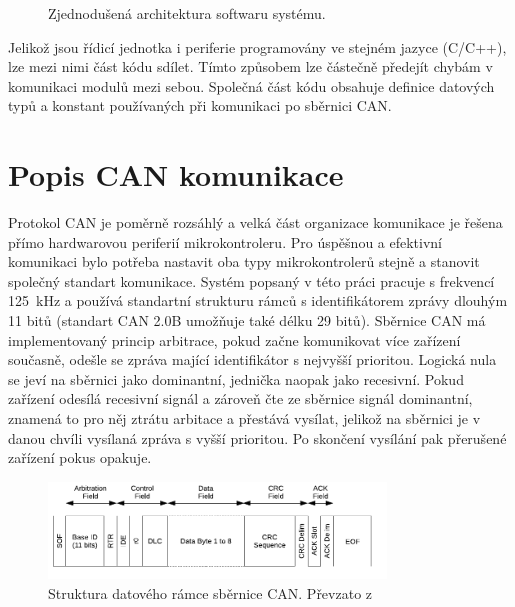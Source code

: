 \begin{figure}[h!]
        
        \caption{Zjednodušená architektura softwaru systému.}
        \label{fig:sw-blokove-schema}
    \end{figure}

    Jelikož jsou řídicí jednotka i periferie programovány ve stejném jazyce (C/C++), lze mezi nimi část kódu sdílet. Tímto způsobem lze částečně předejít chybám v komunikaci modulů mezi sebou. Společná část kódu obsahuje definice datových typů a konstant používaných při komunikaci po sběrnici CAN.  

\section{Popis CAN komunikace}
    Protokol CAN je poměrně rozsáhlý a velká část organizace komunikace je řešena přímo hardwarovou periferií mikrokontroleru. Pro úspěšnou a efektivní komunikaci bylo potřeba nastavit oba typy mikrokontrolerů stejně a stanovit společný standart komunikace. Systém popsaný v této práci pracuje s frekvencí \qty{125}{kHz} a používá standartní strukturu rámců s identifikátorem zprávy dlouhým 11 bitů (standart CAN 2.0B umožňuje také délku 29 bitů). Sběrnice CAN má implementovaný princip arbitrace, pokud začne komunikovat více zařízení současně, odešle se zpráva mající identifikátor s nejvyšší prioritou. Logická nula se jeví na sběrnici jako dominantní, jednička naopak jako recesivní. Pokud zařízení odesílá recesivní signál a zároveň čte ze sběrnice signál dominantní, znamená to pro něj ztrátu arbitace a přestává vysílat, jelikož na sběrnici je v danou chvíli vysílaná zpráva s vyšší prioritou. Po skončení vysílání pak přerušené zařízení pokus opakuje.
    
        \begin{figure}[h!]
            \centering
            \includegraphics[width=0.8\textwidth]{obrazky/can-frame.png}
            \caption{Struktura datového rámce sběrnice CAN. Převzato z~\cite{esp32-datasheet}}
            \label{fig:obrazky/can-frame.png   }
        \end{figure}
        

